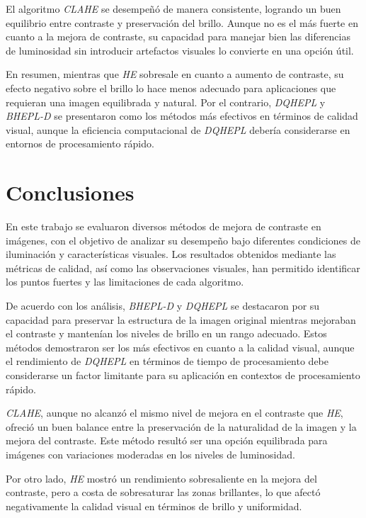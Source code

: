 \documentclass[sigchi]{acmart}
\begin{document}
El algoritmo \emph{CLAHE} se desempeñó de manera consistente, logrando un buen equilibrio
entre contraste y preservación del brillo. Aunque no es el más fuerte en cuanto a la mejora de
contraste, su capacidad para manejar bien las diferencias de luminosidad sin introducir
artefactos visuales lo convierte en una opción útil.

En resumen, mientras que \emph{HE} sobresale en cuanto a aumento de contraste, su efecto
negativo sobre el brillo lo hace menos adecuado para aplicaciones que requieran una imagen
equilibrada y natural. Por el contrario, \emph{DQHEPL} y \emph{BHEPL-D} se presentaron como
los métodos más efectivos en términos de calidad visual, aunque la eficiencia computacional de
\emph{DQHEPL} debería considerarse en entornos de procesamiento rápido.

\section{Conclusiones}
\label{sec:conclusiones}

En este trabajo se evaluaron diversos métodos de mejora de contraste en imágenes, con el
objetivo de analizar su desempeño bajo diferentes condiciones de iluminación y características
visuales. Los resultados obtenidos mediante las métricas de calidad, así como las observaciones
visuales, han permitido identificar los puntos fuertes y las limitaciones de cada algoritmo.

De acuerdo con los análisis, \emph{BHEPL-D} y \emph{DQHEPL} se destacaron por su capacidad
para preservar la estructura de la imagen original mientras mejoraban el contraste y mantenían
los niveles de brillo en un rango adecuado. Estos métodos demostraron ser los más efectivos en
cuanto a la calidad visual, aunque el rendimiento de \emph{DQHEPL} en términos de tiempo de
procesamiento debe considerarse un factor limitante para su aplicación en contextos de
procesamiento rápido.

\emph{CLAHE}, aunque no alcanzó el mismo nivel de mejora en el contraste que \emph{HE},
ofreció un buen balance entre la preservación de la naturalidad de la imagen y la mejora del
contraste. Este método resultó ser una opción equilibrada para imágenes con variaciones
moderadas en los niveles de luminosidad.

Por otro lado, \emph{HE} mostró un rendimiento sobresaliente en la mejora del contraste, pero
a costa de sobresaturar las zonas brillantes, lo que afectó negativamente la calidad visual en
términos de brillo y uniformidad.
\end{document}
